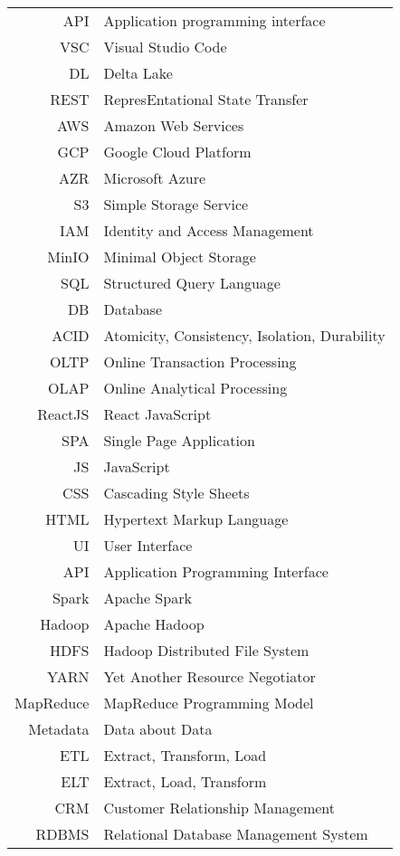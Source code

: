 \listofsigle\begin{tabular}{rl}
API & Application programming interface \\
VSC & Visual Studio Code \\
DL & Delta Lake \\
REST & RepresEntational State Transfer \\
AWS & Amazon Web Services \\
GCP & Google Cloud Platform \\
AZR & Microsoft Azure \\
S3 & Simple Storage Service \\
IAM & Identity and Access Management \\
MinIO & Minimal Object Storage \\
SQL & Structured Query Language \\
DB & Database \\
ACID & Atomicity, Consistency, Isolation, Durability \\
OLTP & Online Transaction Processing \\
OLAP & Online Analytical Processing \\
ReactJS & React JavaScript \\
SPA & Single Page Application \\
JS & JavaScript \\
CSS & Cascading Style Sheets \\
HTML & Hypertext Markup Language \\
UI & User Interface \\
API & Application Programming Interface \\
Spark & Apache Spark \\
Hadoop & Apache Hadoop \\
HDFS & Hadoop Distributed File System \\
YARN & Yet Another Resource Negotiator \\
MapReduce & MapReduce Programming Model \\
Metadata & Data about Data \\
ETL & Extract, Transform, Load \\
ELT & Extract, Load, Transform \\
CRM & Customer Relationship Management \\
RDBMS & Relational Database Management System \\

\end{tabular}
